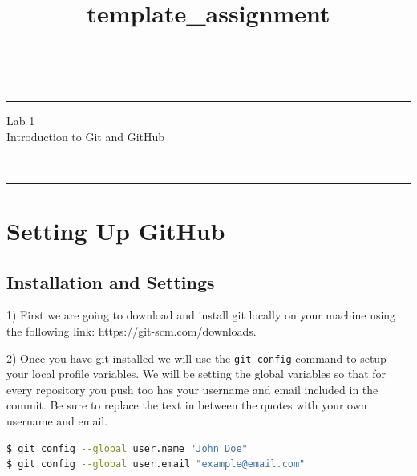 \documentclass[a4paper,10pt]{article} %
\begin{document}

\title{template_assignment} %
\fancyhead[C]{}
\begin{minipage}{0.295\textwidth} %
\raggedright
\hfill\\ %
\medskip\hrule
\end{minipage}
\begin{minipage}{0.4\textwidth} %
\centering 
\large %
Lab 1\\ %
\normalsize %
Introduction to Git and GitHub\\
\end{minipage}
\begin{minipage}{0.295\textwidth} %
\raggedleft
\hfill\\ %
\medskip\hrule
\end{minipage}

\bigskip

\printbibliography

\section{Setting Up GitHub}

\subsection{Installation and Settings}

1) First we are going to download and install git locally on your machine using the following link: https://git-scm.com/downloads.

2) Once you have git installed we will use the \lstinline|git config| command to setup your local profile variables. We will be setting the global variables so that for every repository you push too has your username and email included in the commit. Be sure to replace the text in between the quotes with your own username and email.

\begin{lstlisting}[language=bash]
$ git config --global user.name "John Doe"
$ git config --global user.email "example@email.com"
\end{lstlisting}
\end{document}

